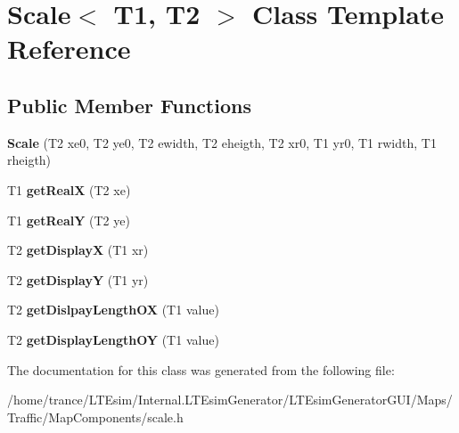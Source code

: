 \hypertarget{class_scale}{}\section{Scale$<$ T1, T2 $>$ Class Template Reference}
\label{class_scale}
\subsection*{Public Member Functions}
\begin{DoxyCompactItemize}
\item 
{\bfseries Scale} (T2 xe0, T2 ye0, T2 ewidth, T2 eheigth, T2 xr0, T1 yr0, T1 rwidth, T1 rheigth)\hypertarget{class_scale_ace122a80a9267ee85562c2afd26d4731}{}\label{class_scale_ace122a80a9267ee85562c2afd26d4731}

\item 
T1 {\bfseries get\+RealX} (T2 xe)\hypertarget{class_scale_a601478e4647ad6a03bba26f23c197520}{}\label{class_scale_a601478e4647ad6a03bba26f23c197520}

\item 
T1 {\bfseries get\+RealY} (T2 ye)\hypertarget{class_scale_a303b65e8dca82efb6c49cb88e47356e3}{}\label{class_scale_a303b65e8dca82efb6c49cb88e47356e3}

\item 
T2 {\bfseries get\+DisplayX} (T1 xr)\hypertarget{class_scale_ab041353f9109cbe2debbb0e58258bda8}{}\label{class_scale_ab041353f9109cbe2debbb0e58258bda8}

\item 
T2 {\bfseries get\+DisplayY} (T1 yr)\hypertarget{class_scale_a863c6669fbdddc1554118c9b4385460d}{}\label{class_scale_a863c6669fbdddc1554118c9b4385460d}

\item 
T2 {\bfseries get\+Dislpay\+Length\+OX} (T1 value)\hypertarget{class_scale_a106a20dd05371a238ee247b489d62ef6}{}\label{class_scale_a106a20dd05371a238ee247b489d62ef6}

\item 
T2 {\bfseries get\+Display\+Length\+OY} (T1 value)\hypertarget{class_scale_ad41c428c56eda0ac164ceec46c11ca07}{}\label{class_scale_ad41c428c56eda0ac164ceec46c11ca07}

\end{DoxyCompactItemize}


The documentation for this class was generated from the following file\+:\begin{DoxyCompactItemize}
\item 
/home/trance/\+L\+T\+Esim/\+Internal.\+L\+T\+Esim\+Generator/\+L\+T\+Esim\+Generator\+G\+U\+I/\+Maps/\+Traffic/\+Map\+Components/scale.\+h\end{DoxyCompactItemize}
